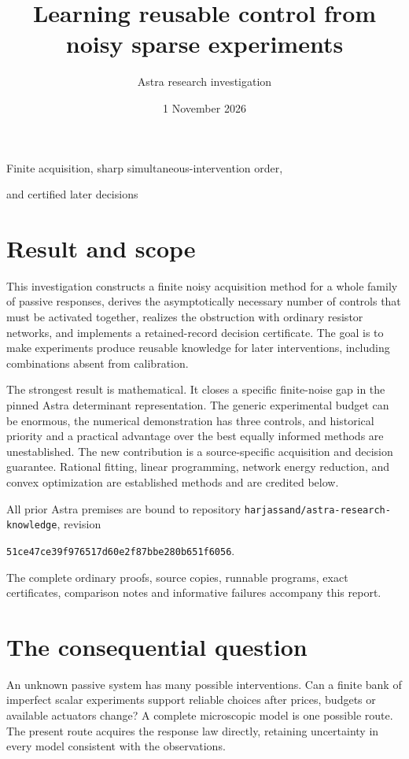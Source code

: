\documentclass[10pt,a4paper]{article}
\title{\sffamily\bfseries Learning reusable control from noisy sparse experiments}
\author{Astra research investigation}
\date{1 November 2026}
\begin{document}
\maketitle
\thispagestyle{fancy}
\begin{center}
\large Finite acquisition, sharp simultaneous-intervention order,\par
and certified later decisions
\end{center}

\section*{Result and scope}

This investigation constructs a finite noisy acquisition method for a whole
family of passive responses, derives the asymptotically necessary number of
controls that must be activated together, realizes the obstruction with ordinary
resistor networks, and implements a retained-record decision certificate. The
goal is to make experiments produce reusable knowledge for later interventions,
including combinations absent from calibration.

The strongest result is mathematical. It closes a specific finite-noise gap in
the pinned Astra determinant representation. The generic experimental budget
can be enormous, the numerical demonstration has three controls, and historical
priority and a practical advantage over the best equally informed methods are
unestablished. The new contribution is a source-specific acquisition and decision
guarantee. Rational fitting, linear programming, network energy reduction, and
convex optimization are established methods and are credited below.

All prior Astra premises are bound to repository
\texttt{harjassand/astra-research-knowledge}, revision
\begin{center}\small\texttt{51ce47ce39f976517d60e2f87bbe280b651f6056}.\end{center}
The complete ordinary proofs, source copies, runnable programs, exact
certificates, comparison notes and informative failures accompany this report.

\section{The consequential question}

An unknown passive system has many possible interventions. Can a finite bank of
imperfect scalar experiments support reliable choices after prices, budgets or
available actuators change? A complete microscopic model is one possible route.
The present route acquires the response law directly, retaining uncertainty in
every model consistent with the observations.
\end{document}

